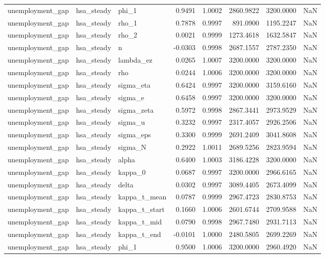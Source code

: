 \begin{tabular}{lllrrrrl}
unemployment\_gap & hsa\_steady & phi\_1 & 0.9491 & 1.0002 & 2860.9822 & 3200.0000 & NaN \\
unemployment\_gap & hsa\_steady & rho\_1 & 0.7878 & 0.9997 & 891.0900 & 1195.2247 & NaN \\
unemployment\_gap & hsa\_steady & rho\_2 & 0.0021 & 0.9999 & 1273.4618 & 1632.5847 & NaN \\
unemployment\_gap & hsa\_steady & n & -0.0303 & 0.9998 & 2687.1557 & 2787.2350 & NaN \\
unemployment\_gap & hsa\_steady & lambda\_ez & 0.0265 & 1.0007 & 3200.0000 & 3200.0000 & NaN \\
unemployment\_gap & hsa\_steady & rho & 0.0244 & 1.0006 & 3200.0000 & 3200.0000 & NaN \\
unemployment\_gap & hsa\_steady & sigma\_eta & 0.6424 & 0.9997 & 3200.0000 & 3159.6160 & NaN \\
unemployment\_gap & hsa\_steady & sigma\_e & 0.6458 & 0.9997 & 3200.0000 & 3200.0000 & NaN \\
unemployment\_gap & hsa\_steady & sigma\_zeta & 0.5972 & 0.9998 & 2867.3441 & 2973.9529 & NaN \\
unemployment\_gap & hsa\_steady & sigma\_u & 0.3232 & 0.9997 & 2317.4057 & 2926.2506 & NaN \\
unemployment\_gap & hsa\_steady & sigma\_eps & 0.3300 & 0.9999 & 2691.2409 & 3041.8608 & NaN \\
unemployment\_gap & hsa\_steady & sigma\_N & 0.2922 & 1.0011 & 2689.5256 & 2823.9594 & NaN \\
unemployment\_gap & hsa\_steady & alpha & 0.6400 & 1.0003 & 3186.4228 & 3200.0000 & NaN \\
unemployment\_gap & hsa\_steady & kappa\_0 & 0.0687 & 0.9997 & 3200.0000 & 2966.6165 & NaN \\
unemployment\_gap & hsa\_steady & delta & 0.0302 & 0.9997 & 3089.4405 & 2673.4099 & NaN \\
unemployment\_gap & hsa\_steady & kappa\_t\_mean & 0.0787 & 0.9999 & 2967.4723 & 2830.8753 & NaN \\
unemployment\_gap & hsa\_steady & kappa\_t\_start & 0.1660 & 1.0006 & 2601.6744 & 2709.9588 & NaN \\
unemployment\_gap & hsa\_steady & kappa\_t\_mid & 0.0790 & 0.9998 & 2967.7480 & 2931.7113 & NaN \\
unemployment\_gap & hsa\_steady & kappa\_t\_end & -0.0101 & 1.0000 & 2480.5805 & 2699.2269 & NaN \\
unemployment\_gap & hsa\_steady & phi\_1 & 0.9500 & 1.0006 & 3200.0000 & 2960.4920 & NaN \\

\end{tabular}
